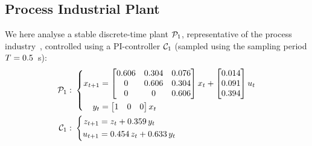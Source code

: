 \subsection{Process Industrial Plant}\label{sec:eval:stable}
We here analyse a stable discrete-time plant $\mathcal{P}_1$, representative of the process industry~\cite{Hagglund:2002}, controlled using a PI-controller $\mathcal{C}_1$ (sampled using the sampling period $T = 0.5$~s):
\begin{equation*}
    \begin{aligned}
        \mathcal{P}_1: \,\, &\left\{
        \begin{aligned}
            x_{t+1} &= \begin{bmatrix}
                0.606 & 0.304 & 0.076 \\
                0 & 0.606 & 0.304 \\
                0 & 0 & 0.606 \\
            \end{bmatrix} x_t + \begin{bmatrix}
                0.014 \\
                0.091 \\
                0.394 \\
            \end{bmatrix} u_t \\
            y_t &= \begin{bmatrix}
                1 & 0 & 0
            \end{bmatrix} x_t
        \end{aligned} \right. \\
        \mathcal{C}_1: \,\, &\left\{
        \begin{aligned}
            z_{t+1} &= z_t + 0.359\, y_t \\
            u_{t+1} &= 0.454\, z_t + 0.633\, y_t
        \end{aligned} \right.
    \end{aligned}
\end{equation*}

\afterpage{
    \clearpage
    \begin{landscape}
        
    \end{landscape}
    \clearpage
}
\afterpage{
    \clearpage
    \begin{landscape}
        
    \end{landscape}
    \clearpage
}

